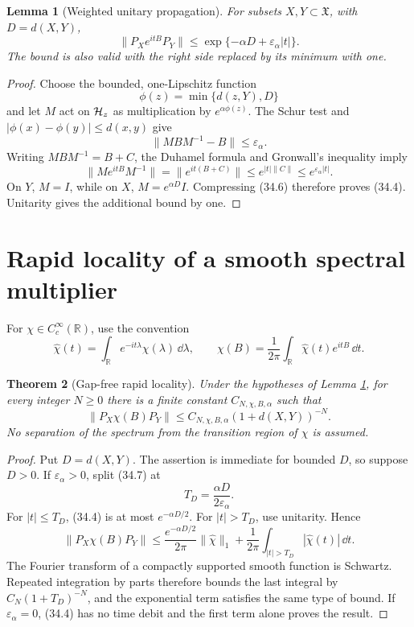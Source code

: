 \documentclass[11pt]{article}
\newtheorem{theorem}{Theorem}[section]
\newtheorem{lemma}[theorem]{Lemma}
\theoremstyle{remark}
\begin{document}
\begin{lemma}[Weighted unitary propagation]
\label{lem:v15v34-propagation}
For subsets \(X,Y\subset\mathfrak X\), with
\(D=d(X,Y)\),
\[
 \|P_Xe^{itB}P_Y\|
 \leq \exp\{-\alpha D+\varepsilon_\alpha|t|\}.             \tag{34.4}
\]
The bound is also valid with the right side replaced by its minimum
with one.
\end{lemma}

\begin{proof}
Choose the bounded, one-Lipschitz function
\[
 \phi(z)=\min\{d(z,Y),D\}
\]
and let \(M\) act on \({\cal H}_z\) as multiplication by
\(e^{\alpha\phi(z)}\).  The Schur test and
\(|\phi(x)-\phi(y)|\leq d(x,y)\) give
\[
 \|MBM^{-1}-B\|\leq\varepsilon_\alpha.                    \tag{34.5}
\]
Writing \(MBM^{-1}=B+C\), the Duhamel formula and Gronwall's
inequality imply
\[
 \|Me^{itB}M^{-1}\|
 =\|e^{it(B+C)}\|
 \leq e^{|t|\|C\|}
 \leq e^{\varepsilon_\alpha|t|}.                          \tag{34.6}
\]
On \(Y\), \(M=I\), while on \(X\),
\(M=e^{\alpha D}I\).  Compressing (34.6) therefore proves
(34.4).  Unitarity gives the additional bound by one.
\end{proof}

\section{Rapid locality of a smooth spectral multiplier}

For \(\chi\in C_c^\infty(\mathbb R)\), use the convention
\[
 \widehat\chi(t)=\int_{\mathbb R}e^{-it\lambda}
                 \chi(\lambda)\,\dd\lambda,
 \qquad
 \chi(B)=\frac1{2\pi}\int_{\mathbb R}
                 \widehat\chi(t)e^{itB}\,\dd t.           \tag{34.7}
\]

\begin{theorem}[Gap-free rapid locality]
\label{thm:v15v34-smooth-locality}
Under the hypotheses of Lemma
\ref{lem:v15v34-propagation}, for every integer \(N\geq0\) there
is a finite constant \(C_{N,\chi,B,\alpha}\) such that
\[
 \boxed{
 \|P_X\chi(B)P_Y\|
 \leq C_{N,\chi,B,\alpha}(1+d(X,Y))^{-N}.}                 \tag{34.8}
\]
No separation of the spectrum from the transition region of
\(\chi\) is assumed.
\end{theorem}

\begin{proof}
Put \(D=d(X,Y)\).  The assertion is immediate for bounded \(D\),
so suppose \(D>0\).  If \(\varepsilon_\alpha>0\), split (34.7) at
\[
 T_D=\frac{\alpha D}{2\varepsilon_\alpha}.                 \tag{34.9}
\]
For \(|t|\leq T_D\), (34.4) is at most
\(e^{-\alpha D/2}\).  For \(|t|>T_D\), use unitarity.  Hence
\[
 \|P_X\chi(B)P_Y\|
 \leq \frac{e^{-\alpha D/2}}{2\pi}\|\widehat\chi\|_1
 +\frac1{2\pi}\int_{|t|>T_D}|\widehat\chi(t)|\,\dd t.    \tag{34.10}
\]
The Fourier transform of a compactly supported smooth function is
Schwartz.  Repeated integration by parts therefore bounds the last
integral by \(C_N(1+T_D)^{-N}\), and the exponential term satisfies
the same type of bound.  If \(\varepsilon_\alpha=0\), (34.4) has no
time debit and the first term alone proves the result.
\end{proof}
\end{document}
